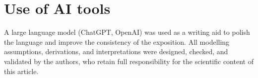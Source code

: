 \section*{Use of AI tools}
A large language model (ChatGPT, OpenAI) was used as a writing aid to polish the language and improve the consistency of the exposition. All modelling assumptions, derivations, and interpretations were designed, checked, and validated by the authors, who retain full responsibility for the scientific content of this article.

